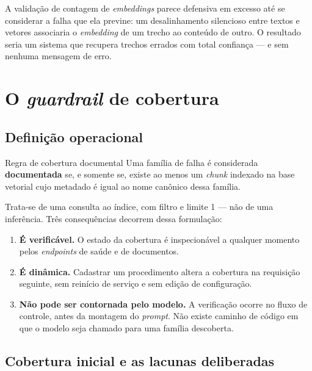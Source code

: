 \begin{atencao}
A validação de contagem de \textit{embeddings} parece defensiva em excesso até
se considerar a falha que ela previne: um desalinhamento silencioso entre
textos e vetores associaria o \textit{embedding} de um trecho ao conteúdo de
outro. O resultado seria um sistema que recupera trechos errados com total
confiança --- e sem nenhuma mensagem de erro.
\end{atencao}

\section{O \textit{guardrail} de cobertura}

\subsection{Definição operacional}

\begin{especificacao}{Regra de cobertura documental}
Uma família de falha é considerada \textbf{documentada} se, e somente se,
existe ao menos um \textit{chunk} indexado na base vetorial cujo metadado
 é igual ao nome canônico dessa família.
\end{especificacao}

Trata-se de uma consulta ao índice, com filtro e limite 1 --- não de uma
inferência. Três consequências decorrem dessa formulação:

\begin{enumerate}
  \item \textbf{É verificável.} O estado da cobertura é inspecionável a qualquer
    momento pelos \textit{endpoints} de saúde e de documentos.
  \item \textbf{É dinâmica.} Cadastrar um procedimento altera a cobertura na
    requisição seguinte, sem reinício de serviço e sem edição de configuração.
  \item \textbf{Não pode ser contornada pelo modelo.} A verificação ocorre no
    fluxo de controle, antes da montagem do \textit{prompt}. Não existe caminho
    de código em que o modelo seja chamado para uma família descoberta.
\end{enumerate}

\subsection{Cobertura inicial e as lacunas deliberadas}

